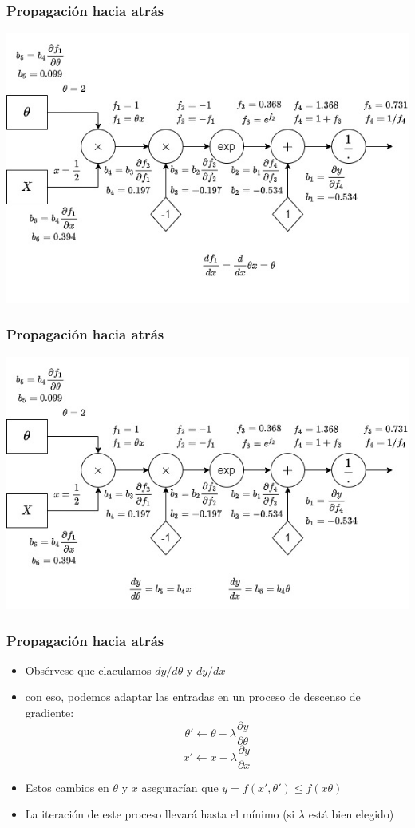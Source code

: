 \documentclass{beamer}
\begin{document}
\begin{frame}
\frametitle{Propagación hacia atrás}
\includegraphics[scale=0.4]{im8}
\end{frame}
\begin{frame}
\frametitle{Propagación hacia atrás}
\includegraphics[scale=0.4]{im9}
\end{frame}
\begin{frame}
\frametitle{Propagación hacia atrás}
\begin{itemize}
\item Obsérvese que claculamos $dy/d\theta$ y $dy/dx$
\item con eso, podemos adaptar las entradas en un proceso de descenso de gradiente:   
\begin{equation*}
\theta' \leftarrow \theta - \lambda \frac{\partial y}{\partial \theta} 
\end{equation*}
\begin{equation*}
x' \leftarrow x - \lambda \frac{\partial y}{\partial x} 
\end{equation*}
\item Estos cambios en $\theta$ y $x$ asegurarían que $y=f(x',\theta') \leq f(x\theta)$
\item La iteración de este proceso llevará hasta el mínimo (si $\lambda$ está bien elegido)
\end{itemize}
\end{frame}
\end{document}
